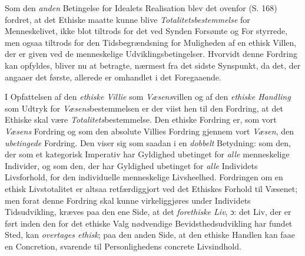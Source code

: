 Som den \emph{anden} Betingelse for Idealets Realisation blev det ovenfor (S.
168) fordret, at det Ethiske maatte kunne blive \emph{Totalitetsbestemmelse} for
Menneskelivet, ikke blot tiltrods for det ved Synden Forsømte og For\-%
styrrede, men ogsaa tiltrods for den Tidsbegrændsning for Muligheden af en ethisk
Villen, der er given ved de menneskelige Udviklingsbetingelser. Hvorvidt denne
Fordring kan opfyldes, bliver nu at betragte, nærmest fra det sidste Synspunkt,
da det, der angaaer det første, allerede er omhandlet i det Foregaaende.

I Opfattelsen af den \emph{ethiske Villie} som \emph{Væsens}villen og af den
\emph{ethiske Handling} som Udtryk for \emph{Væsens}bestemmelsen er der viist hen
til den Fordring, at det Ethiske skal være \emph{Totalitets}bestemmelse. Den
ethiske Fordring er, som vort \emph{Væsens} Fordring og som den absolute Villies
Fordring gjennem vort \emph{Væsen}, den \emph{ubetingede} Fordring. Den viser sig
som saadan i en \emph{dobbelt} Betydning: som den, der som et kategorisk Imperativ
har Gyldighed ubetinget for \emph{alle} menneskelige Individer, og som den, der
har Gyldighed ubetinget for \emph{alle} Individets Livsforhold, for den
individuelle menneskelige Livsheelhed. Fordringen om en ethisk Livstotalitet er
altsaa retfærdiggjort ved det Ethiskes Forhold til Væsenet; men forat denne
Fordring skal kunne virkeliggjøres under Individets Tidsudvikling, kræves paa den
ene Side, at det \emph{forethiske Liv}, ɔ: det Liv, der er ført inden den for det
ethiske Valg nødvendige Bevidsthedsudvikling har fundet Sted, kan
\emph{overtages ethisk}; paa den anden Side, at den ethiske Handlen kan faae en
Concretion, svarende til Personlighedens concrete Livsindhold.

